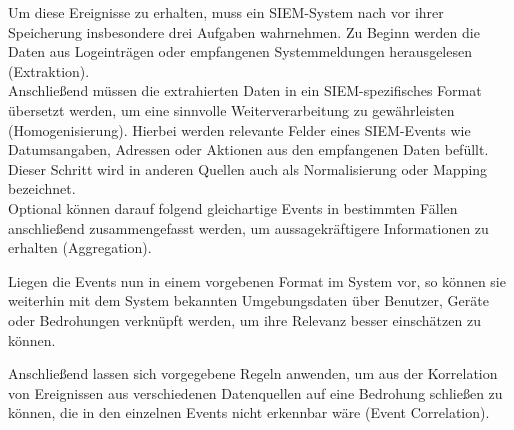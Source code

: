 Um diese Ereignisse zu erhalten, muss ein SIEM-System nach \cite{detken2014} vor ihrer Speicherung insbesondere drei Aufgaben wahrnehmen. Zu Beginn werden die Daten aus Logeinträgen oder empfangenen Systemmeldungen herausgelesen (Extraktion).\\
Anschließend müssen die extrahierten Daten in ein SIEM-spezifisches Format übersetzt werden, um eine sinnvolle Weiterverarbeitung zu gewährleisten (Homogenisierung). Hierbei werden relevante Felder eines SIEM-Events wie Datumsangaben, Adressen oder Aktionen aus den empfangenen Daten befüllt. Dieser Schritt wird in anderen Quellen auch als Normalisierung oder Mapping bezeichnet.\\
Optional können darauf folgend gleichartige Events in bestimmten Fällen anschließend zusammengefasst werden, um aussagekräftigere Informationen zu erhalten (Aggregation).

Liegen die Events nun in einem vorgebenen Format im System vor, so können sie weiterhin mit dem System bekannten Umgebungsdaten über Benutzer, Geräte oder Bedrohungen verknüpft werden, um ihre Relevanz besser einschätzen zu können. 

Anschließend lassen sich vorgegebene Regeln anwenden, um aus der Korrelation von Ereignissen aus verschiedenen Datenquellen auf eine Bedrohung schließen zu können, die in den einzelnen Events nicht erkennbar wäre (Event Correlation).

